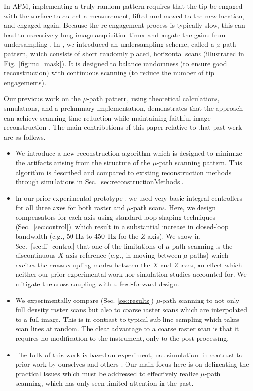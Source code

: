 \documentclass[journal]{IEEEtran}
\begin{document}
In AFM, implementing a truly random pattern requires that the tip be
engaged with the surface to collect a measurement, lifted and moved to
the new location, and engaged again.
Because the re-engagement process
is typically slow, this can lead to excessively long image acquisition
times and negate the gains from undersampling \cite{andersson2012non}.
In \cite{maxwell2014compressed}, we introduced an undersampling scheme,
called a $\mu$-path pattern, which consists of short randomly placed,
horizontal scans (illustrated in Fig.~\ref{fig:mu_mask}). It
is designed to balance randomness (to ensure good
reconstruction) with continuous scanning (to reduce the number of tip
engagements).

Our previous work on the $\mu$-path pattern, using theoretical
calculations, simulations, and a preliminary implementation,
demonstrates that the approach can achieve scanning time
reduction while maintaining faithful image reconstruction
\cite{maxwell2014compressed,Luo:2015tu, braker_hardware_2018}. 
The main contributions of this paper relative to that past work are as follows.
\begin{itemize}
\item We introduce a new reconstruction algorithm which is designed to
minimize the artifacts arising from the structure of the $\mu$-path
scanning pattern. This algorithm is described and compared to existing
reconstruction methods through simulations in Sec. \ref{sec:reconstructionMethods}.
\item In our prior experimental prototype \cite{braker_hardware_2018}, we used very basic integral controllers for all three axes for both raster and $\mu$-path scans. Here, we design compensators for each axis using standard loop-shaping techniques (Sec.~\ref{sec:control}), which result in a substantial increase in closed-loop bandwidth (e.g., 50 Hz to 450~Hz for the $Z$-axis).
We show in Sec.~\ref{sec:ff_control} that one of the limitations of $\mu$-path scanning is the discontinuous $X$-axis reference (e.g., in moving between $\mu$-paths) which excites the cross-coupling modes between the $X$ and $Z$ axes, an effect which neither our prior experimental work nor simulation studies accounted for. We mitigate the cross coupling with a feed-forward design.
\item We experimentally compare (Sec. \ref{sec:results}) $\mu$-path scanning to not only full density raster scans but also to coarse raster scans which are interpolated to a full image. This is in contrast to typical sub-line sampling which takes scan lines at random. The clear advantage to a coarse raster scan is that it requires no modification to the instrument, only to the post-processing.
\item The bulk of this work is based on experiment, not simulation, in contrast to prior work by ourselves \cite{luo2015comparison,maxwell2014compressed} and others \cite{han_optimal_2018,jensen_reconstruction_2013,oxvig_structure_2017}. Our main focus here is on delineating the practical issues which must be addressed to effectively realize $\mu$-path scanning, which has only seen limited attention in the past.
\end{itemize}
\end{document}
